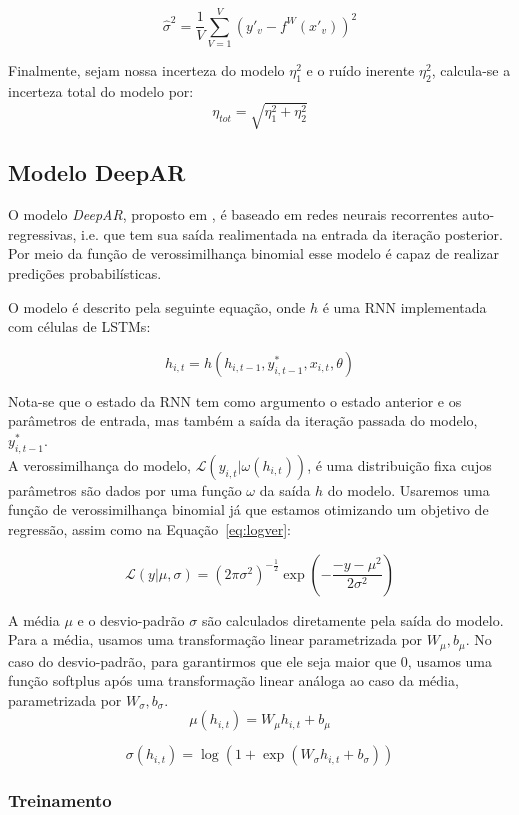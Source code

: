 \[ \hat{\sigma}^2 = \frac{1}{V}\sum^V_{V=1}(y'_v - f^W(x'_v))^2 \]

Finalmente, sejam nossa incerteza do modelo $\eta_1^2$ e o ruído inerente
$\eta^2_2$, calcula-se a incerteza total do modelo por: \\

\[  \eta_{tot} = \sqrt{  \eta_1^2 + \eta_2^2 }  \]


\subsection{Modelo DeepAR}

O modelo \textit{DeepAR}, proposto em \cite{deepar}, é baseado em redes neurais recorrentes auto-regressivas,
i.e. que tem sua saída realimentada na entrada da iteração posterior. Por meio da função de verossimilhança binomial esse modelo é capaz
de realizar predições probabilísticas.

O modelo é descrito pela seguinte equação, onde $h$ é uma RNN implementada com células de LSTMs:

\[
h_{i,t} = h(h_{i,t-1},y^*_{i,t-1},x_{i,t}, \theta)
\]

Nota-se que o estado da RNN tem como argumento o estado anterior e os parâmetros de entrada, mas também a saída da iteração passada do modelo, $y^*_{i,t-1}$. \\

A verossimilhança do modelo, $\mathcal{L}(y_{i,t} | \omega(h_{i,t}))$, é uma distribuição fixa cujos parâmetros são dados por uma função $\omega$ da saída $h$ do modelo. Usaremos uma função de verossimilhança binomial já que estamos otimizando um objetivo de regressão, assim como na Equação~\ref{eq:logver}:

\[
\mathcal{L}(y | \mu,\sigma) = {(2\pi\sigma^2)}^{-\frac{1}{2}} \exp(-  \frac{-y - \mu^2}{2\sigma^2})  
\]

A média $\mu$ e o desvio-padrão $\sigma$ são calculados diretamente pela saída do modelo. Para a média, usamos uma transformação linear parametrizada por $W_{\mu},b_{\mu}$. No caso do desvio-padrão, para garantirmos que ele seja maior que 0, usamos uma função softplus após uma transformação linear análoga ao caso da média, parametrizada por  $W_{\sigma},b_{\sigma}$.\\

\[ \mu(h_{i,t}) = W_{\mu}h_{i,t} + b_{\mu} \]

\[ \sigma(h_{i,t}) = \log(1 + \exp(W_{\sigma}h_{i,t}+ b_{\sigma})) \]


\subsubsection{Treinamento}



